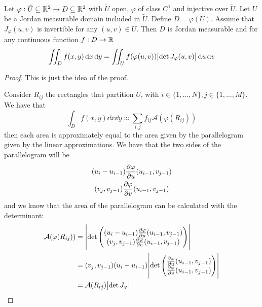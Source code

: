 \documentclass[12pt]{extarticle}
\begin{document}
\begin{theorem}
    Let $\varphi: \tilde{U} \subseteq \mathbb{R}^2 \to D \subseteq \mathbb{R}^2$ with $\tilde{U}$ open, $\varphi$ of class $C^1$ and injective over $\tilde{U}$.
    Let $U$ be a Jordan measurable domain included in $\tilde{U}$.
    Define $D = \varphi(U)$.
    Assume that $J_\varphi (u,v)$ is invertible for any $(u, v) \in U$.
    Then $D$ is Jordan measurable and for any continuous function $f:D \to \mathbb{R}$
    \begin{equation}
        \iint_D f(x, y) \dd{x}\dd{y} = \iint_U f(\varphi(u, v)) \abs{\det J_{\varphi}(u, v)} \dd{u} \dd{v}
    \end{equation}
\end{theorem}
\begin{proof}
    This is just the idea of the proof.

    Consider $R_{ij}$ the rectangles that partition $U$, with $i \in \{1, \ldots,N\}, j \in \{1, \ldots,M\}$.
    We have that
    \begin{equation}
        \int_D f(x, y) \dd{x} \dd{y} \approx \sum_{i,j} f_{ij} \mathcal A (\varphi(R_{ij}))
    \end{equation}
    then each area is approximately equal to the area given by the parallelogram given by the linear approximations.
    We have that the two sides of the parallelogram will be
    \begin{gather}
        (u_i - u_{i-1}) \pdv{\varphi}{u}\/(u_{i-1}, v_{j-1}) \\
        (v_j, v_{j-1}) \pdv{\varphi}{v}\/(u_{i-1}, v_{j-1})
    \end{gather}
    and we know that the area of the parallelogram can be calculated with the determinant:
    \begin{align}
        \mathcal A(\varphi(R_{ij})) & = \abs{\det \begin{pmatrix}
                                                          (u_i - u_{i-1}) \pdv{\varphi}{u}\/(u_{i-1}, v_{j-1}) \\
                                                          (v_j, v_{j-1}) \pdv{\varphi}{v}\/(u_{i-1}, v_{j-1})
                                                      \end{pmatrix}}               \\
                                    & = (v_j, v_{j-1})(u_i - u_{i-1}) \abs{\det \begin{pmatrix}
                                                                                        \pdv{\varphi}{u}\/(u_{i-1}, v_{j-1}) \\
                                                                                        \pdv{\varphi}{v}\/(u_{i-1}, v_{j-1})
                                                                                    \end{pmatrix}} \\
                                    & = \mathcal A(R_{ij}) \abs{\det J_\varphi}
    \end{align}


\end{proof}
\end{document}
